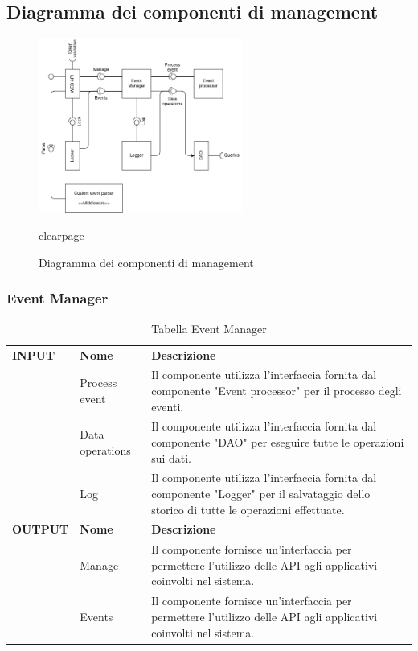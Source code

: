 \documentclass{article}
\begin{document}
\clearpage

\subsection{Diagramma dei componenti di management}

\begin{figure}[htbp]
    \centering
    \includegraphics[width=0.6\textwidth]{Images/ManagementServer - Component.png}
    \caption{Diagramma dei componenti di management}
    \label{fig:component-diagram-management}
    clearpage\end{figure}

\subsubsection{Event Manager}

\begin{table}[htbp]
    \centering
    \renewcommand{\arraystretch}{1.3} %
    \begin{tabularx}{\textwidth}{| l | l | X |}
        \Xhline{2pt}
        \textbf{INPUT} & \textbf{Nome} & \textbf{Descrizione} \\
        \Xhline{2pt}
         & Process event & Il componente utilizza l'interfaccia fornita dal componente "Event processor" per il processo degli eventi. \\
        \hline
         & Data operations & Il componente utilizza l'interfaccia fornita dal componente "DAO" per eseguire tutte le operazioni sui dati. \\
        \hline
         & Log & Il componente utilizza l'interfaccia fornita dal componente "Logger" per il salvataggio dello storico di tutte le operazioni effettuate. \\
        \Xhline{2pt}
        \textbf{OUTPUT} & \textbf{Nome} & \textbf{Descrizione} \\
        \Xhline{2pt}
         & Manage & Il componente fornisce un'interfaccia per permettere l'utilizzo delle API agli applicativi coinvolti nel sistema. \\
        \hline
         & Events & Il componente fornisce un'interfaccia per permettere l'utilizzo delle API agli applicativi coinvolti nel sistema. \\
        \hline
    \end{tabularx}
    \caption{Tabella Event Manager}
\end{table}
\end{document}

